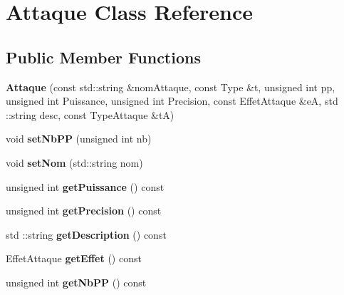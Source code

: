 \hypertarget{class_attaque}{}\section{Attaque Class Reference}
\label{class_attaque}
\subsection*{Public Member Functions}
\begin{DoxyCompactItemize}
\item 
\mbox{\label{class_attaque_a0d06199581234d41d63a842b3efa3716}} 
{\bfseries Attaque} (const std\+::string \&nom\+Attaque, const Type \&t, unsigned int pp, unsigned int Puissance, unsigned int Precision, const Effet\+Attaque \&eA, std \+::string desc, const Type\+Attaque \&tA)
\item 
\mbox{\label{class_attaque_a6e0b308dd1d9ddab688378e2630cb597}} 
void {\bfseries set\+Nb\+PP} (unsigned int nb)
\item 
\mbox{\label{class_attaque_a15bcb3d5d9add6357427cfb399e5584a}} 
void {\bfseries set\+Nom} (std\+::string nom)
\item 
\mbox{\label{class_attaque_a92ae062d505e82c80621069dc6a917d1}} 
unsigned int {\bfseries get\+Puissance} () const
\item 
\mbox{\label{class_attaque_ada8c22f0becc001b46e6a7f2da00a1ef}} 
unsigned int {\bfseries get\+Precision} () const
\item 
\mbox{\label{class_attaque_aa2e4cf0577df21c32295b757bc6e0dc5}} 
std \+::string {\bfseries get\+Description} () const
\item 
\mbox{\label{class_attaque_a1776bbc505173b30dc6577a806228a78}} 
Effet\+Attaque {\bfseries get\+Effet} () const
\item 
\mbox{\label{class_attaque_aa95b1e494a9c24dfd28c585e46cd1eb8}} 
unsigned int {\bfseries get\+Nb\+PP} () const
\item 
\mbox{\label{class_attaque_a651deeca5e47dd04929bd1c9d013c86e}} 

\end{DoxyCompactItemize}
